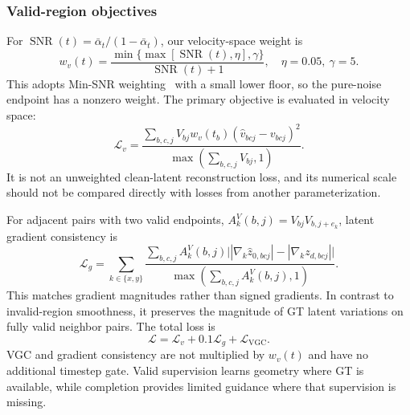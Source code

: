 \documentclass[10pt,journal,a4paper]{IEEEtran}
\begin{document}
\subsubsection{Valid-region objectives}
For $\operatorname{SNR}(t)=\bar\alpha_t/(1-\bar\alpha_t)$, our velocity-space weight is
\begin{equation}
	w_v(t)=\frac{\min\{\max[\operatorname{SNR}(t),\eta],\gamma\}}
	{\operatorname{SNR}(t)+1},\quad \eta=0.05,\ \gamma=5.
	\label{eq:snr}
\end{equation}
This adopts Min-SNR weighting~\cite{hang2023efficient} with a small lower floor, so the pure-noise endpoint has a nonzero weight. The primary objective is evaluated in velocity space:
\begin{equation}
	\mathcal L_v=
	\frac{\sum_{b,c,j} V_{bj}w_v(t_b)(\hat v_{bcj}-v_{bcj})^2}
	{\max(\sum_{b,c,j}V_{bj},1)}.
	\label{eq:valid_loss}
\end{equation}
It is not an unweighted clean-latent reconstruction loss, and its numerical scale should not be compared directly with losses from another parameterization.

For adjacent pairs with two valid endpoints, $A^V_k(b,j)=V_{bj}V_{b,j+e_k}$, latent gradient consistency is
\begin{equation}
	\mathcal L_g=\sum_{k\in\{x,y\}}
	\frac{\sum_{b,c,j}A^V_k(b,j)
		\big||\nabla_k\hat z_{0,bcj}|-|\nabla_k z_{d,bcj}|\big|}
	{\max(\sum_{b,c,j}A^V_k(b,j),1)}.
	\label{eq:grad}
\end{equation}
This matches gradient magnitudes rather than signed gradients. In contrast to invalid-region smoothness, it preserves the magnitude of GT latent variations on fully valid neighbor pairs. The total loss is
\begin{equation}
	\mathcal L=\mathcal L_v+0.1\mathcal L_g+\mathcal L_{\mathrm{VGC}}.
	\label{eq:total}
\end{equation}
VGC and gradient consistency are not multiplied by $w_v(t)$ and have no additional timestep gate. Valid supervision learns geometry where GT is available, while completion provides limited guidance where that supervision is missing.
\end{document}
